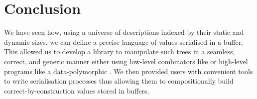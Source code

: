\section{Conclusion}

We have seen how, using a universe of descriptions indexed by their static
and dynamic sizes, we can define a precise language of values serialised in
a buffer.
%
This allowed us to develop a library to manipulate such trees in a seamless,
correct, and generic manner either using low-level combinators like
 or high-level programs like a data-polymorphic
.
%
We then provided users with convenient tools to write serialisation processes
thus allowing them to compositionally build correct-by-construction values
stored in buffers.
